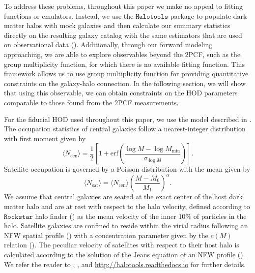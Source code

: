 To address these problems, throughout this paper we make no appeal to fitting functions or emulators. 
Instead, we use the $\mathtt{Halotools}$ package to populate dark matter halos with mock galaxies and 
then calculate our summary statistics directly on the resulting galaxy catalog with the same estimators 
that are used on observational data (\citealt{halotools}). Additionally, through our forward modeling approaching, we are
able to explore observables beyond the 2PCF, such as the group multiplicity function, for which 
there is no available fitting function. This framework allows us to use group multiplicity function for providing quantitative constraints on the galaxy-halo connection. In the following section, we will show that using this observable, we can obtain constraints on the HOD parameters comparable to those found from the 2PCF measurements. 

For the fiducial HOD used throughout this paper, we use the model described in \citealt{zheng07}. 
The occupation statistics of central galaxies follow a nearest-integer distribution with first 
moment given by 
\begin{equation}
\label{eq:ncen}
\langle N_{\mathrm{cen}}\rangle = \frac{1}{2} \left[ 1 + \mathrm{erf}\left(\frac{\log M - \log M_{\mathrm{min}}}{\sigma_{\log M}}\right)\right].
\end{equation}
Satellite occupation is governed by a Poisson distribution with the mean given by 
\begin{equation}
\label{eq:nsat}
\langle N_{\mathrm{sat}}\rangle =  \langle N_{\mathrm{cen}} \rangle \left(\frac{M-M_{0}}{M_1}\right)^{\alpha}.
\end{equation}
We assume that central galaxies are seated at the exact center of the host dark matter halo and 
are at rest with respect to the halo velocity, defined according to $\mathtt{Rockstar}$ halo finder (\cite{rockstar})
as the mean velocity of the inner $10\%$ of particles in the halo. Satellite galaxies are confined to 
reside within the virial radius following an NFW spatial profile (\citealt{nfw}) with a concentration 
parameter given by the $c(M)$ relation (\citealt{nfw_c(M)}). The peculiar velocity of satellites with 
respect to their host halo is calculated according to the solution of the Jeans equation of an NFW 
profile (\citealt{more2010}). We refer the reader to \cite{decorated}, 
\cite{halotools}, and \url{http://halotools.readthedocs.io}
for further details.  

